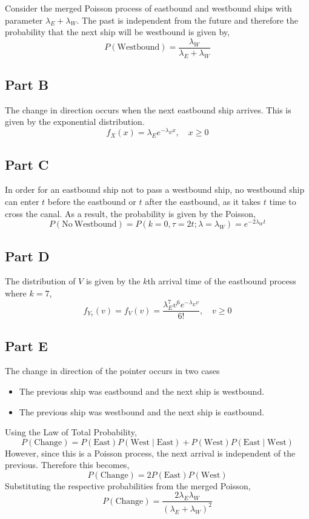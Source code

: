 \documentclass{article}
\begin{document}
Consider the merged Poisson process of eastbound and westbound ships with
parameter $\lambda_E + \lambda_W$. The past is independent from the future
and therefore the probability that the next ship will be westbound is given
by,
$$ P(\mathrm{Westbound}) = \frac{\lambda_W}{\lambda_E + \lambda_W} $$

\subsection*{Part B}

The change in direction occurs when the next eastbound ship arrives. This is
given by the exponential distribution.
$$ f_X(x) = \lambda_E e^{-\lambda_E x},\quad x \geq 0 $$

\subsection*{Part C}

In order for an eastbound ship not to pass a westbound ship, no westbound
ship can enter $t$ before the eastbound or $t$ after the eastbound, as it
takes $t$ time to cross the canal. As a result, the probability is given by
the Poisson,
$$ P(\mathrm{No\ Westbound}) = P(k = 0, \tau = 2t; \lambda = \lambda_W) =
e^{-2 \lambda_W t} $$

\subsection*{Part D}

The distribution of $V$ is given by the $k$th arrival time of the eastbound
process where $k = 7$,
$$ f_{Y_7}(v) = f_V(v) = \frac{\lambda_E^7 v^6 e^{-\lambda_E v}}{6!},\quad v
\geq 0 $$

\subsection*{Part E}

The change in direction of the pointer occurs in two cases
\begin{itemize}
  \item The previous ship was eastbound and the next ship is westbound.
  \item The previous ship was westbound and the next ship is eastbound.
\end{itemize}
Using the Law of Total Probability,
$$ P(\mathrm{Change}) = P(\mathrm{East})P(\mathrm{West} \mid \mathrm{East}) +
P(\mathrm{West})P(\mathrm{East} \mid \mathrm{West}) $$
However, since this is a Poisson process, the next arrival is independent of
the previous. Therefore this becomes,
$$ P(\mathrm{Change}) = 2 P(\mathrm{East})P(\mathrm{West}) $$
Substituting the respective probabilities from the merged Poisson,
$$ P(\mathrm{Change}) = \frac{2 \lambda_E \lambda_W}{(\lambda_E +
\lambda_W)^2} $$
\end{document}
